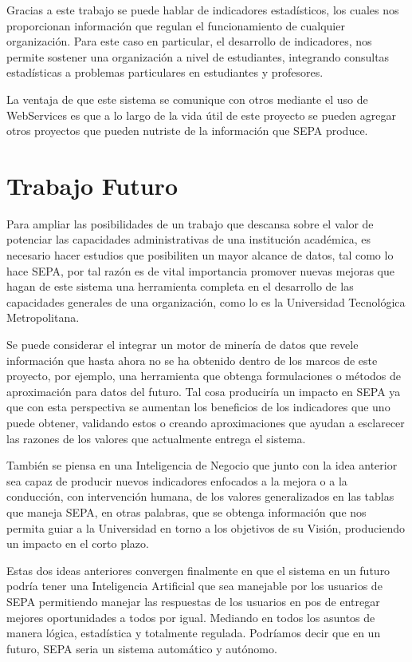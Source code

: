 \documentclass[a4paper,12pt,openany,oneside]{book}
\begin{document}
Gracias a este trabajo se puede hablar de indicadores estadísticos, los cuales nos proporcionan información que regulan el funcionamiento de cualquier organización. Para este caso en particular, el desarrollo de indicadores, nos permite sostener una organización a nivel de estudiantes, integrando consultas estadísticas a problemas particulares en estudiantes y profesores.

La ventaja de que este sistema se comunique con otros mediante el uso de WebServices es que a lo largo de la vida útil de este proyecto se pueden agregar otros proyectos que pueden nutriste de la información que SEPA produce.
\section{Trabajo Futuro}
Para ampliar las posibilidades de un trabajo que descansa sobre el valor de potenciar las capacidades administrativas de una institución académica, es necesario hacer estudios que posibiliten un mayor alcance de datos, tal como lo hace SEPA, por tal razón es de vital importancia promover nuevas mejoras que hagan de este sistema una herramienta completa en el desarrollo de las capacidades generales de una organización, como lo es la Universidad Tecnológica Metropolitana.

Se puede considerar el integrar un motor de minería de datos que revele información que hasta ahora no se ha obtenido dentro de los marcos de este proyecto, por ejemplo, una herramienta que obtenga formulaciones o métodos de aproximación para datos del futuro. Tal cosa produciría un impacto en SEPA ya que con esta perspectiva se aumentan los beneficios de los indicadores que uno puede obtener, validando estos o creando aproximaciones que ayudan a esclarecer las razones de los valores que actualmente entrega el sistema.

También se piensa en una Inteligencia de Negocio que junto con la idea anterior sea capaz de producir nuevos indicadores enfocados a la mejora o a la conducción, con intervención humana, de los valores generalizados en las tablas que maneja SEPA, en otras palabras, que se obtenga información que nos permita guiar a la Universidad en torno a los objetivos de su Visión, produciendo un impacto en el corto plazo.

Estas dos ideas anteriores convergen finalmente en que el sistema en un futuro podría tener una Inteligencia Artificial que sea manejable por los usuarios de SEPA permitiendo manejar las respuestas de los usuarios en pos de entregar mejores oportunidades a todos por igual. Mediando en todos los asuntos de manera lógica, estadística y totalmente regulada. Podríamos decir que en un futuro, SEPA seria un sistema automático y autónomo.
\end{document}
